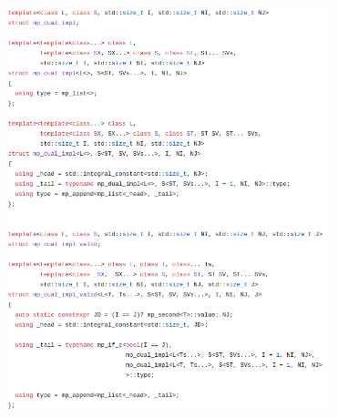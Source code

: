 \documentclass[xcolor=dvipsnames]{beamer}
\begin{document}
\begin{frame}[plain]
  \begin{columns}[T] %
    \begin{column}{0.5\textwidth}
      \begin{figure}[H]
        \centering
        \includegraphics[width=0.99\textwidth]{dual_1}
      \end{figure}
    \end{column}%
    \hfill%
    \begin{column}{0.5\textwidth}
      \begin{figure}[H]
        \centering

\end{figure}
\end{column}
\end{columns}
\end{frame}
\end{document}
